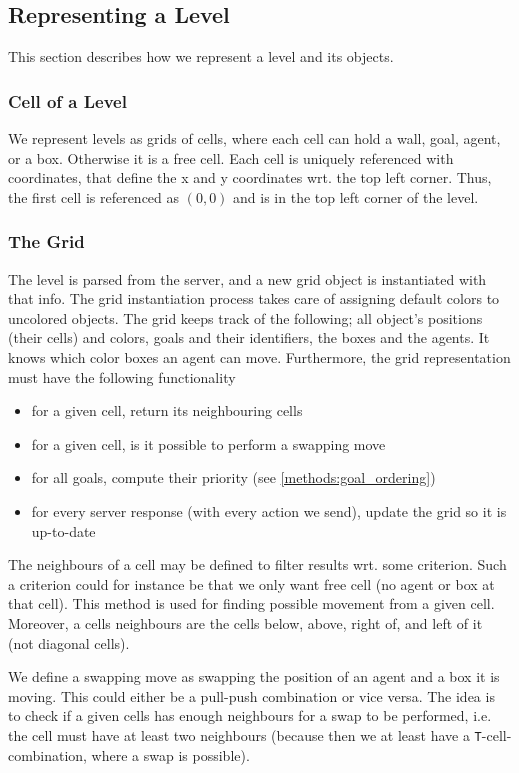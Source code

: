 \subsection{Representing a Level}

This section describes how we represent a level and its objects.

\subsubsection{Cell of a Level}

We represent levels as grids of cells, where each cell can hold a wall, goal, agent, or a box.
Otherwise it is a free cell.
Each cell is uniquely referenced with coordinates, that define the x and y coordinates wrt. the top left corner.
Thus, the first cell is referenced as $(0,0)$ and is in the top left corner of the level.

\subsubsection{The Grid}

The level is parsed from the server, and a new grid object is instantiated with that info.
The grid instantiation process takes care of assigning default colors to uncolored objects.
The grid keeps track of the following; all object's positions (their cells) and colors, goals and their identifiers, the boxes and the agents.
It knows which color boxes an agent can move.
Furthermore, the grid representation must have the following functionality
%
\begin{itemize}
  \item for a given cell, return its neighbouring cells
  \item for a given cell, is it possible to perform a swapping move
  \item for all goals, compute their priority (see \cref{methods:goal_ordering})
  \item for every server response (with every action we send), update the grid so it is up-to-date
\end{itemize}
%
The neighbours of a cell may be defined to filter results wrt. some criterion.
Such a criterion could for instance be that we only want free cell (no agent or box at that cell).
This method is used for finding possible movement from a given cell.
Moreover, a cells neighbours are the cells below, above, right of, and left of it (not diagonal cells).

We define a swapping move as swapping the position of an agent and a box it is moving.
This could either be a pull-push combination or vice versa.
The idea is to check if a given cells has enough neighbours for a swap to be performed, i.e. the cell must have at least two neighbours (because then we at least have a \texttt{T}-cell-combination, where a swap is possible).

